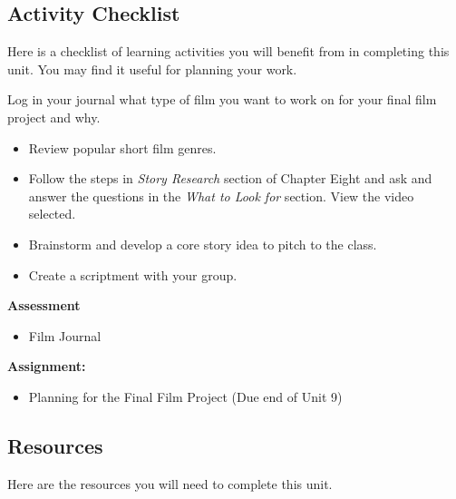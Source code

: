 \documentclass[
]{book}
\providecommand{\tightlist}{%
  \setlength{\itemsep}{0pt}\setlength{\parskip}{0pt}}
\begin{document}
\hypertarget{activity-checklist-7}{%
\subsection*{Activity Checklist}\label{activity-checklist-7}}

\begin{reflect}
Here is a checklist of learning activities you will benefit from in completing this unit. You may find it useful for planning your work.

Log in your journal what type of film you want to work on for your final film project and why.

\begin{itemize}
\tightlist
\item
  Review popular short film genres.
\item
  Follow the steps in \emph{Story Research} section of Chapter Eight and ask and answer the questions in the \emph{What to Look for} section. View the video selected.
\item
  Brainstorm and develop a core story idea to pitch to the class.
\item
  Create a scriptment with your group.
\end{itemize}

\textbf{Assessment}

\begin{itemize}
\tightlist
\item
  Film Journal
\end{itemize}

\textbf{Assignment:}

\begin{itemize}
\tightlist
\item
  Planning for the Final Film Project (Due end of Unit 9)
\end{itemize}
\end{reflect}

\hypertarget{resources-7}{%
\subsection*{Resources}\label{resources-7}}

Here are the resources you will need to complete this unit.
\end{document}
